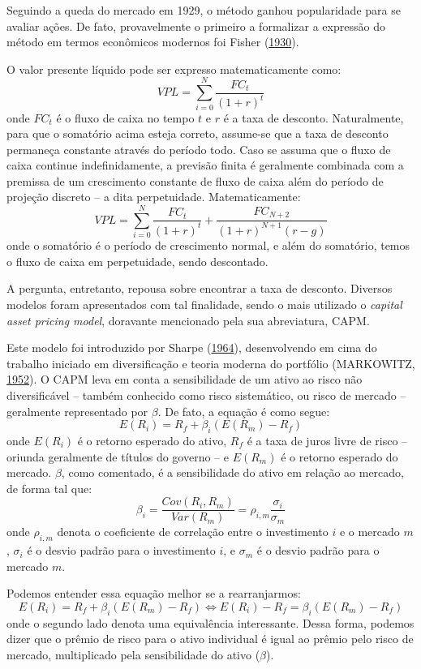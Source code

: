 \documentclass[grad,numbers]{coppe}
\begin{document}
  Seguindo a queda do mercado em 1929, o método ganhou popularidade para se avaliar ações. De fato, provavelmente o primeiro a formalizar a expressão do método em termos econômicos modernos foi Fisher (\protect\hyperlink{ref-fisher1930}{1930}).

  O valor presente líquido pode ser expresso matematicamente como: \[
  VPL = \sum_{i=0}^N\frac{FC_t}{(1+r)^t}
  \] onde \(FC_t\) é o fluxo de caixa no tempo \(t\) e \(r\) é a taxa de desconto. Naturalmente, para que o somatório acima esteja correto, assume-se que a taxa de desconto permaneça constante através do período todo. Caso se assuma que o fluxo de caixa continue indefinidamente, a previsão finita é geralmente combinada com a premissa de um crescimento constante de fluxo de caixa além do período de projeção discreto -- a dita perpetuidade. Matematicamente: \[
  VPL = \sum_{i=0}^N\frac{FC_t}{(1+r)^t} + \frac{FC_{N+2}}{(1+r)^{N+1}(r-g)}
  \] onde o somatório é o período de crescimento normal, e além do somatório, temos o fluxo de caixa em perpetuidade, sendo descontado.

  A pergunta, entretanto, repousa sobre encontrar a taxa de desconto. Diversos modelos foram apresentados com tal finalidade, sendo o mais utilizado o \emph{capital asset pricing model}, doravante mencionado pela sua abreviatura, CAPM.

  Este modelo foi introduzido por Sharpe (\protect\hyperlink{ref-sharpe1964}{1964}), desenvolvendo em cima do trabalho iniciado em diversificação e teoria moderna do portfólio (MARKOWITZ, \protect\hyperlink{ref-markowitz1952}{1952}). O CAPM leva em conta a sensibilidade de um ativo ao risco não diversificável -- também conhecido como risco sistemático, ou risco de mercado -- geralmente representado por \(\beta\). De fato, a equação é como segue: \[
  E(R_i) = R_f + \beta_i(E(R_m)-R_f)
  \] onde \(E(R_i)\) é o retorno esperado do ativo, \(R_f\) é a taxa de juros livre de risco -- oriunda geralmente de títulos do governo -- e \(E(R_m)\) é o retorno esperado do mercado. \(\beta\), como comentado, é a sensibilidade do ativo em relação ao mercado, de forma tal que: \[
  \beta_i = \frac{Cov(R_i, R_m)}{Var(R_m)} = \rho_{i,m}\frac{\sigma_i}{\sigma_m}
  \] onde \(\rho_{i,m}\) denota o coeficiente de correlação entre o investimento \(i\) e o mercado \(m\), \(\sigma_i\) é o desvio padrão para o investimento \(i\), e \(\sigma_m\) é o desvio padrão para o mercado \(m\).

  Podemos entender essa equação melhor se a rearranjarmos: \[
  E(R_i) = R_f + \beta_i(E(R_m)-R_f) \iff E(R_i) - R_f = \beta_i(E(R_m)-R_f)
  \] onde o segundo lado denota uma equivalência interessante. Dessa forma, podemos dizer que o prêmio de risco para o ativo individual é igual ao prêmio pelo risco de mercado, multiplicado pela sensibilidade do ativo (\(\beta\)).
\end{document}
